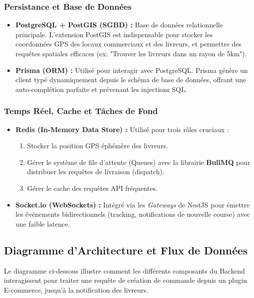 \subsubsection{Persistance et Base de Données}
\begin{itemize}
    \item \textbf{PostgreSQL + PostGIS (SGBD) :} Base de données relationnelle principale. L'extension PostGIS est indispensable pour stocker les coordonnées GPS des locaux commerciaux et des livreurs, et permettre des requêtes spatiales efficaces (ex: "Trouver les livreurs dans un rayon de 5km").
    \item \textbf{Prisma (ORM) :} Utilisé pour interagir avec PostgreSQL. Prisma génère un client typé dynamiquement depuis le schéma de base de données, offrant une auto-complétion parfaite et prévenant les injections SQL.
\end{itemize}

\subsubsection{Temps Réel, Cache et Tâches de Fond}
\begin{itemize}
    \item \textbf{Redis (In-Memory Data Store) :} Utilisé pour trois rôles cruciaux : 
    \begin{enumerate}
        \item Stocker la position GPS éphémère des livreurs.
        \item Gérer le système de file d'attente (Queues) avec la librairie \textbf{BullMQ} pour distribuer les requêtes de livraison (dispatch).
        \item Gérer le cache des requêtes API fréquentes.
    \end{enumerate}
    \item \textbf{Socket.io (WebSockets) :} Intégré via les \textit{Gateways} de NestJS pour émettre les événements bidirectionnels (tracking, notifications de nouvelle course) avec une faible latence.
\end{itemize}

\subsection{Diagramme d'Architecture et Flux de Données}

Le diagramme ci-dessous illustre comment les différents composants du Backend interagissent pour traiter une requête de création de commande depuis un plugin E-commerce, jusqu'à la notification des livreurs.



